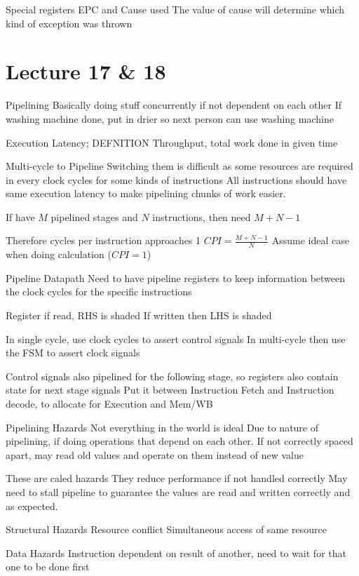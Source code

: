 \documentclass{article}
\begin{document}
		Special registers EPC and Cause used
			The value of cause will determine which kind of exception was thrown

\section*{Lecture 17 \& 18}
	Pipelining
		Basically doing stuff concurrently if not dependent on each other
		If washing machine done, put in drier so next person can use washing machine

		Execution Latency; DEFNITION
		Throughput, total work done in given time

	Multi-cycle to Pipeline
		Switching them is difficult as some resources are required in every clock cycles for some kinds of instructions
		All instructions should have same execution latency to make pipelining chunks of work easier.

		If have $M$ pipelined stages and $N$ instructions, then need $M + N - 1$

		Therefore cycles per instruction approaches 1
		$CPI = \frac{M + N - 1}{N}$
		Assume ideal case when doing calculation ($CPI = 1$)

	Pipeline Datapath
		Need to have pipeline registers to keep information between the clock cycles for the specific instructions

		Register if read, RHS is shaded
		If written then LHS is shaded

		In single cycle, use clock cycles to assert control signals
		In multi-cycle then use the FSM to assert clock signals

		Control signals also pipelined for the following stage, so registers also contain state for next stage signals
		Put it between Instruction Fetch and Instruction decode, to allocate for Execution and Mem/WB

	Pipelining Hazards
		Not everything in the world is ideal
		Due to nature of pipelining, if doing operations that depend on each other. If not correctly spaced apart, may read old values and operate on them instead of new value

		These are caled hazards
		They reduce performance if not handled correctly
		May need to stall pipeline to guarantee the values are read and written correctly and as expected.


		Structural Hazards
			Resource conflict
			Simultaneous access of same resource

		Data Hazards
			Instruction dependent on result of another, need to wait for that one to be done first
\end{document}
